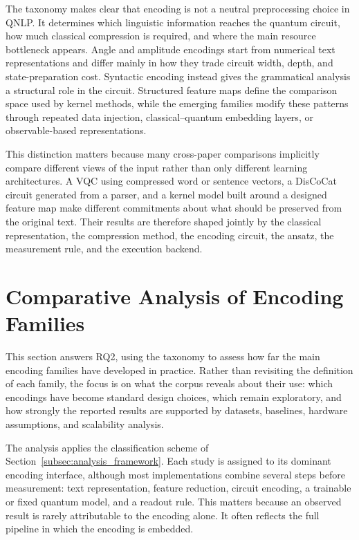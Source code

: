\documentclass{ieeeaccess}
\begin{document}
The taxonomy makes clear that encoding is not a neutral preprocessing choice in QNLP. It determines which linguistic information reaches the quantum circuit, how much classical compression is required, and where the main resource bottleneck appears. Angle and amplitude encodings start from numerical text representations and differ mainly in how they trade circuit width, depth, and state-preparation cost. Syntactic encoding instead gives the grammatical analysis a structural role in the circuit. Structured feature maps define the comparison space used by kernel methods, while the emerging families modify these patterns through repeated data injection, classical--quantum embedding layers, or observable-based representations.

This distinction matters because many cross-paper comparisons implicitly compare different views of the input rather than only different learning architectures. A VQC using compressed word or sentence vectors, a DisCoCat circuit generated from a parser, and a kernel model built around a designed feature map make different commitments about what should be preserved from the original text. Their results are therefore shaped jointly by the classical representation, the compression method, the encoding circuit, the ansatz, the measurement rule, and the execution backend.

\section{Comparative Analysis of Encoding Families}
\label{sec:comparative_analysis}

This section answers RQ2, using the taxonomy to assess how far the main encoding families have developed in practice. Rather than revisiting the definition of each family, the focus is on what the corpus reveals about their use: which encodings have become standard design choices, which remain exploratory, and how strongly the reported results are supported by datasets, baselines, hardware assumptions, and scalability analysis.

The analysis applies the classification scheme of Section~\ref{subsec:analysis_framework}. Each study is assigned to its dominant encoding interface, although most implementations combine several steps before measurement: text representation, feature reduction, circuit encoding, a trainable or fixed quantum model, and a readout rule. This matters because an observed result is rarely attributable to the encoding alone. It often reflects the full pipeline in which the encoding is embedded.
\end{document}
